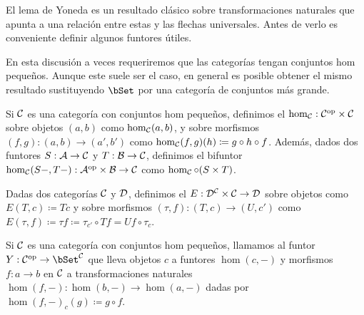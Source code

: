 El lema de Yoneda es un resultado clásico sobre transformaciones naturales que
apunta a una relación entre estas y las flechas universales. Antes de verlo es
conveniente definir algunos funtores útiles.

En esta discusión a veces requeriremos que las categorías tengan conjuntos hom
pequeños. Aunque este suele ser el caso, en general es posible obtener el mismo
resultado sustituyendo $\bSet$ por una categoría de conjuntos más grande.

\begin{definition}
  Si $\mathcal{C}$ es una categoría con conjuntos hom pequeños, definimos el
   $\hom_{\mathcal{C}}:\mathcal{C}^{\mathrm{op}}\times\mathcal{C}$ sobre objetos $(a,b)$ como
  $\hom_{\mathcal{C}}(a,b)$, y sobre morfismos $(f,g):(a,b)\to(a',b')$ como
  $\hom_{\mathcal{C}}(f,g)(h)\coloneqq g\circ h\circ f$. Además, dados dos funtores
  $S:\mathcal{A}\to\mathcal{C}$ y $T:\mathcal{B}\to\mathcal{C}$, definimos el bifuntor
  $\hom_{\mathcal{C}}(S-,T-):\mathcal{A}^{\mathrm{op}}\times\mathcal{B}\to\mathcal{C}$ como $\hom_{\mathcal{C}}\circ(S\times T)$.
\end{definition}

\begin{definition}
  Dadas dos categorías $\mathcal{C}$ y $\mathcal{D}$, definimos el 
  $E:\mathcal{D}^{\mathcal{C}}\times\mathcal{C}\to\mathcal{D}$ sobre objetos como $E(T,c)\coloneqq Tc$ y sobre
  morfismos $(\tau,f):(T,c)\to(U,c')$ como
  $E(\tau,f)\coloneqq \tau f\coloneqq\tau_{c'}\circ Tf=Uf\circ\tau_c$.
\end{definition}

\begin{definition}
  Si $\mathcal{C}$ es una categoría con conjuntos hom pequeños, llamamos  al funtor $Y:\dual{\cC}\to\bSet^\cC$ que lleva objetos $c$ a
  funtores $\hom(c,-)$ y morfismos $f:a\to b$ en $\mathcal{C}$ a transformaciones
  naturales $\hom(f,-):\hom(b,-)\to\hom(a,-)$ dadas por
  $\hom(f,-)_c(g)\coloneqq g\circ f$.
\end{definition}

